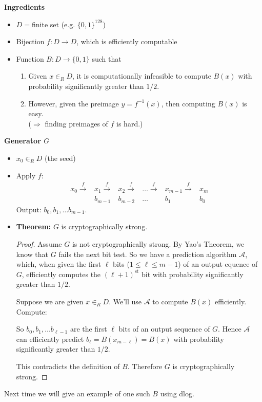 \documentclass[a4paper,12pt]{article}
\begin{document}
{\bf Ingredients}
\begin{itemize}
\item
$D=$finite set (e.g. $\{0,1\}^{128}$)
\item
Bijection $f:D\to D$, which is efficiently computable
\item
Function $B:D\to \{0,1\}$ such that
\begin{enumerate}[($i$)]
\item
Given $x\in_RD$, it is computationally infeasible to compute $B(x)$
with probability significantly greater than $1/2$.
\item
However, given the preimage $y=f^{-1}(x)$, then computing $B(x)$ is easy.\\
($\Rightarrow$ finding preimages of $f$ is hard.)
\end{enumerate}
\end{itemize}
{\bf Generator $G$}
\begin{itemize}
\item
$x_0 \in_R D$ (the seed)
\item
Apply $f$:
\begin{align*}
x_0 \overset{f}{\to} &x_1 \overset{f}{\to} &x_2 \overset{f}{\to} &\ldots \overset{f}{\to} &x_{m-1} \overset{f}{\to} &x_m\\
& b_{m-1} & b_{m-2} & \ldots & b_1 & b_0
\end{align*}
Output: $b_0,b_1,\ldots b_{m-1}$.
\item
{\bf Theorem:} $G$ is cryptographically strong.
\begin{proof}
Assume $G$ is not cryptographically strong.  By Yao's Theorem, we know that $G$ fails the next bit test.  So we have a prediction algorithm $\mathcal A$, which, when given the first $\ell$ bits ($1\le \ell \le m-1$) of an output equence of $G$, efficiently computes the $(\ell +1)^{\text{st}}$ bit with probability significantly greater than $1/2$.

Suppose we are given $x\in_R D$.  We'll use $\mathcal A$ to compute $B(x)$ efficiently.
Compute:

So $b_0,b_1,\ldots b_{\ell -1}$ are the first $\ell$ bits of an output sequence of $G$.  Hence $\mathcal A$ can efficiently predict $b_\ell =B(x_{m-\ell})=B(x)$ with probability significantly greater than $1/2$.

This contradicts the definition of $B$.  Therefore $G$ is cryptographically strong.
\end{proof}
\end{itemize}
Next time we will give an example of one such $B$ using {\sc dlog}.
\end{document}
